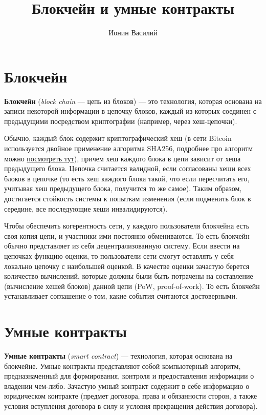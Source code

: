 \documentclass{article}
\title{Блокчейн и умные контракты}
\author{Ионин Василий}
\date{}
\begin{document}
\maketitle

\section{Блокчейн}

\textbf{Блокчейн} (\textit{block chain} --- цепь из блоков) --- это технология, которая основана на записи некоторой информации в цепочку блоков, каждый из которых соединен с предыдущими посредством криптографии (например, через хеш-цепочки).

Обычно, каждый блок содержит криптографический хеш (в сети Bitcoin используется двойное применение алгоритма SHA256, подробнее про алгоритм можно \href{https://en.bitcoin.it/wiki/Block_hashing_algorithm}{посмотреть тут}), причем хеш каждого блока в цепи зависит от хеша предыдущего блока. Цепочка считается валидной, если согласованы хеши всех блоков в цепочке (то есть хеш каждого блока такой, что если пересчитать его, учитывая хеш предыдущего блока, получится то же самое). Таким образом, достигается стойкость системы к попыткам изменения (если подменить блок в середине, все последующие хеши инвалидируются).

Чтобы обеспечить когерентность сети, у каждого пользователя блокчейна есть своя копия цепи, и участники ими постоянно обмениваются. То есть блокчейн обычно представляет из себя децентрализованную систему. Если ввести на цепочках функцию оценки, то пользователи сети смогут оставлять у себя локально цепочку с наибольшей оценкой. В качестве оценки зачастую берется количество вычислений, которые должны были быть потрачены на составление (вычисление хешей блоков) данной цепи (PoW, proof-of-work). То есть блокчейн устанавливает соглашение о том, какие события считаются достоверными.

\section{Умные контракты}

\textbf{Умные контракты} (\textit{smart contract}) --- технология, которая основана на блокчейне. Умные контракты представляют собой компьютерный алгоритм, предназначенный для формирования, контроля и предоставления информации о владении чем-либо. Зачастую умный контракт содержит в себе информацию о юридическом контракте (предмет договора, права и обязанности сторон, а также условия вступления договора в силу и условия прекращения действия договора).
\end{document}
